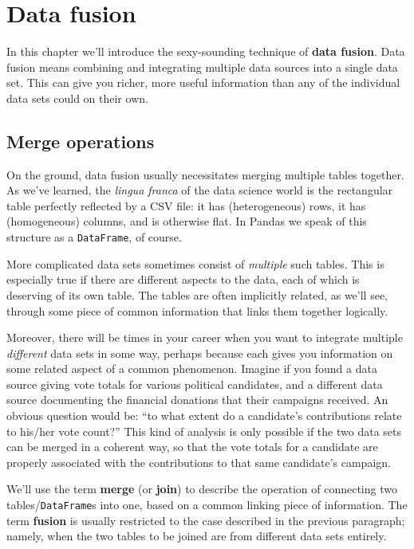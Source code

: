 
\chapter{Data fusion}


In this chapter we'll introduce the sexy-sounding technique of \textbf{data
fusion}. Data fusion means combining and integrating multiple data sources into
a single data set. This can give you richer, more useful information than any
of the individual data sets could on their own.

\section{Merge operations}


On the ground, data fusion usually necessitates merging multiple tables
together. As we've learned, the \textit{lingua franca} of the data science
world is the rectangular table perfectly reflected by a CSV file: it has
(heterogeneous) rows, it has (homogeneous) columns, and is otherwise flat. In
Pandas we speak of this structure as a \texttt{DataFrame}, of course.

More complicated data sets sometimes consist of \textit{multiple} such tables.
This is especially true if there are different aspects to the data, each of
which is deserving of its own table. The tables are often implicitly related,
as we'll see, through some piece of common information that links them
together logically.

Moreover, there will be times in your career when you want to integrate
multiple \textit{different} data sets in some way, perhaps because each gives
you information on some related aspect of a common phenomenon. Imagine if you
found a data source giving vote totals for various political candidates, and a
different data source documenting the financial donations that their campaigns
received. An obvious question would be: ``to what extent do a candidate's
contributions relate to his/her vote count?'' This kind of analysis is only
possible if the two data sets can be merged in a coherent way, so that the
vote totals for a candidate are properly associated with the contributions to
that same candidate's campaign.

We'll use the term \textbf{merge} (or \textbf{join}) to describe the operation
of connecting two tables/\texttt{DataFrame}s into one, based on a common linking piece
of information. The term \textbf{fusion} is usually restricted to the case
described in the previous paragraph; namely, when the two tables to be joined
are from different data sets entirely.


